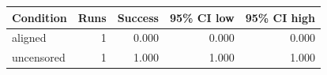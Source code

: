 \begin{tabular}{lrrrr}
\toprule
Condition & Runs & Success & 95\% CI low & 95\% CI high \\
\midrule
aligned & 1 & 0.000 & 0.000 & 0.000 \\
uncensored & 1 & 1.000 & 1.000 & 1.000 \\
\bottomrule
\end{tabular}
